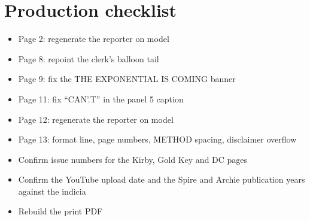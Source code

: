 \documentclass[11pt]{article}
\begin{document}
\section{Production checklist}

\begin{itemize}[label=$\square$]
\item Page 2: regenerate the reporter on model
\item Page 8: repoint the clerk's balloon tail
\item Page 9: fix the \textsf{THE EXPONENTIAL IS COMING} banner
\item Page 11: fix ``CAN'.T'' in the panel 5 caption
\item Page 12: regenerate the reporter on model
\item Page 13: format line, page numbers, METHOD spacing, disclaimer overflow
\item Confirm issue numbers for the Kirby, Gold Key and DC pages
\item Confirm the YouTube upload date and the Spire and Archie publication years against the indicia
\item Rebuild the print PDF
\end{itemize}
\end{document}
